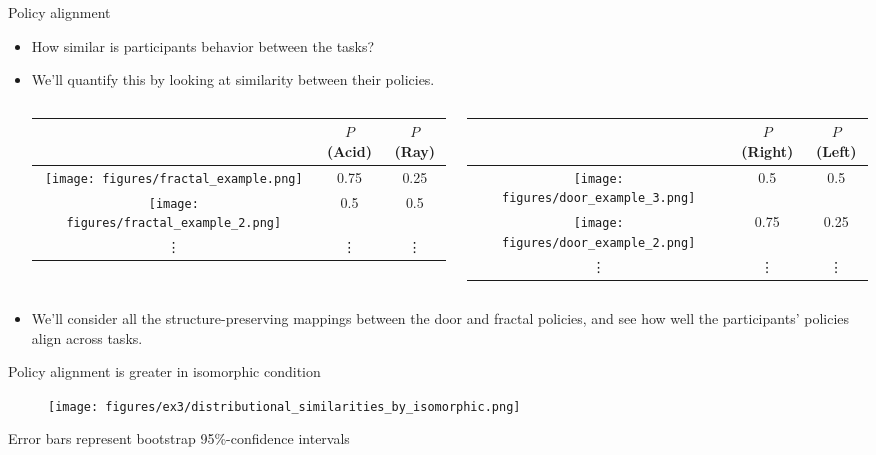 \documentclass{beamer}
\begin{document}
\begin{frame}{Policy alignment}
\begin{itemize}
\item How similar is participants behavior between the tasks? 
\item<2-> We'll quantify this by looking at similarity between their policies.
\begin{columns}
\begin{column}{0.5\textwidth}
\begin{center}
\begin{tabular}{|c|c|c|}
\hline 
& \(P\)(Acid) & \(P\)(Ray) \\
\hline
\texttt{[image: figures/fractal\_example.png]} & 0.75 & 0.25\\ \hline
\texttt{[image: figures/fractal\_example\_2.png]} & 0.5 & 0.5 \\ \hline
 \vdots & \vdots & \vdots \\ \hline
\end{tabular}
\end{center}
\end{column}
\begin{column}{0.5\textwidth}
\begin{center}
\begin{tabular}{|c|c|c|}
\hline 
& \(P\)(Right) & \(P\)(Left) \\
\hline
\texttt{[image: figures/door\_example\_3.png]} & 0.5 & 0.5\\ \hline
\texttt{[image: figures/door\_example\_2.png]} & 0.75 & 0.25 \\ \hline
 \vdots & \vdots & \vdots \\ \hline
\end{tabular}
\end{center}
\end{column}
\end{columns}
\item<3-> We'll consider all the structure-preserving mappings between the door and fractal policies, and see how well the participants' policies align across tasks.
\end{itemize}
\end{frame}

\begin{frame}{Policy alignment is greater in isomorphic condition}
\begin{figure}
\centering
\texttt{[image: figures/ex3/distributional\_similarities\_by\_isomorphic.png]}
\end{figure}
{\scriptsize Error bars represent bootstrap 95\%-confidence intervals}
\end{frame}
\end{document}
